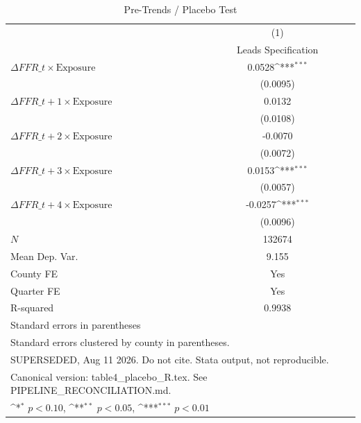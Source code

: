 \begin{table}[htbp]\centering
\def\sym#1{\ifmmode^{#1}\else\(^{#1}\)\fi}
\caption{Pre-Trends / Placebo Test}
\begin{tabular}{l*{1}{c}}
\toprule
            &\multicolumn{1}{c}{(1)}\\
            &\multicolumn{1}{c}{Leads Specification}\\
\midrule
$\Delta FFR\_t \times \text{Exposure}$&      0.0528\sym{***}\\
            &    (0.0095)         \\
\addlinespace
$\Delta FFR\_{t+1} \times \text{Exposure}$&      0.0132         \\
            &    (0.0108)         \\
\addlinespace
$\Delta FFR\_{t+2} \times \text{Exposure}$&     -0.0070         \\
            &    (0.0072)         \\
\addlinespace
$\Delta FFR\_{t+3} \times \text{Exposure}$&      0.0153\sym{***}\\
            &    (0.0057)         \\
\addlinespace
$\Delta FFR\_{t+4} \times \text{Exposure}$&     -0.0257\sym{***}\\
            &    (0.0096)         \\
\midrule
\(N\)       &      132674         \\
Mean Dep. Var.&       9.155         \\
County FE   &         Yes         \\
Quarter FE  &         Yes         \\
R-squared   &      0.9938         \\
\bottomrule
\multicolumn{2}{l}{\footnotesize Standard errors in parentheses}\\
\multicolumn{2}{l}{\footnotesize Standard errors clustered by county in parentheses.}\\
\multicolumn{2}{l}{\footnotesize SUPERSEDED, Aug 11 2026. Do not cite. Stata output, not reproducible.}\\
\multicolumn{2}{l}{\footnotesize Canonical version: table4\_placebo\_R.tex. See PIPELINE\_RECONCILIATION.md.}\\
\multicolumn{2}{l}{\footnotesize \sym{*} \(p<0.10\), \sym{**} \(p<0.05\), \sym{***} \(p<0.01\)}\\
\end{tabular}
\end{table}
